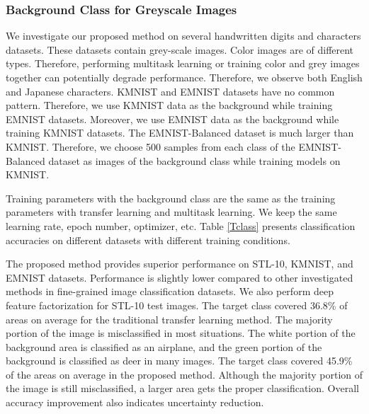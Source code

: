\documentclass{article}
\begin{document}
\subsubsection{Background Class for Greyscale Images}
We investigate our proposed method on several handwritten digits and characters datasets. These datasets contain grey-scale images. Color images are of different types. Therefore, performing multitask learning or training color and grey images together can potentially degrade performance. Therefore, we observe both English and Japanese characters. KMNIST and EMNIST datasets have no common pattern. Therefore, we use KMNIST data as the background while training EMNIST datasets. Moreover, we use EMNIST data as the background while training KMNIST datasets. The EMNIST-Balanced dataset is much larger than KMNIST. Therefore, we choose 500 samples from each class of the EMNIST-Balanced dataset as images of the background class while training models on KMNIST.


Training parameters with the background class are the same as the training parameters with transfer learning and multitask learning. We keep the same learning rate, epoch number, optimizer, etc. Table \ref{Tclass} presents classification accuracies on different datasets with different training conditions. 

The proposed method provides superior performance on STL-10, KMNIST, and EMNIST datasets. Performance is slightly lower compared to other investigated methods in fine-grained image classification datasets. We also perform deep feature factorization for STL-10 test images. The target class covered 36.8\% of areas on average for the traditional transfer learning method. The majority portion of the image is misclassified in most situations. The white portion of the background area is classified as an airplane, and the green portion of the background is classified as deer in many images. The target class covered 45.9\% of the areas on average in the proposed method. Although the majority portion of the image is still misclassified, a larger area gets the proper classification. Overall accuracy improvement also indicates uncertainty reduction.
\end{document}
